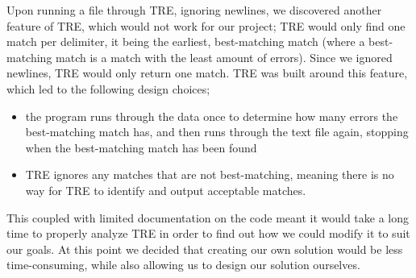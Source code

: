 Upon running a file through TRE, ignoring newlines, we discovered 
another feature of TRE, which would not work for our project; TRE would only 
find one match per delimiter, it being the earliest, best-matching match (where a 
best-matching match is a match with the least amount of errors). Since we ignored 
newlines, TRE would only 
return one match. TRE was built around this feature, which led to the following 
design choices;
\begin{itemize}
\item the program runs through the data once to determine how many errors the 
best-matching match has, and then runs through the text file again, stopping 
when the best-matching match has been found 
\item TRE ignores any matches that are not best-matching, meaning there is 
no way for TRE to identify and output acceptable matches.
\end{itemize}
This coupled with limited documentation on the code meant it would 
take a long time to properly analyze TRE in order to find out how we could 
modify it to suit our goals. At this point we decided that creating our 
own solution would be less time-consuming, while also allowing us to design our 
solution ourselves.
